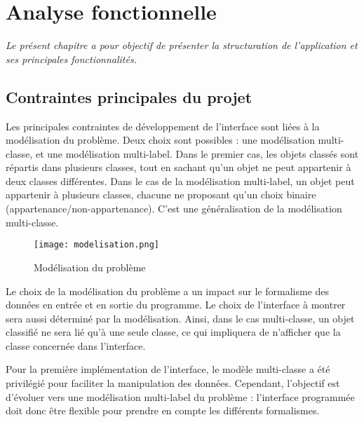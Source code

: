 \chapter[Analyse fonctionnelle]{Analyse fonctionnelle}

\textit{Le présent chapitre a pour objectif de présenter la structuration de l'application et ses principales fonctionnalités.}

\section{Contraintes principales du projet}

Les principales contraintes de développement de l’interface sont liées à la modélisation du problème. Deux choix sont possibles : une modélisation multi-classe, et une modélisation multi-label. Dans le premier cas, les objets classés sont répartis dans plusieurs classes, tout en sachant qu’un objet ne peut appartenir à deux classes différentes. Dans le cas de la modélisation multi-label, un objet peut appartenir à plusieurs classes, chacune ne proposant qu’un choix binaire (appartenance/non-appartenance). C’est une généralisation de la modélisation multi-classe.\newline

\begin{figure}[!h]
	\begin{center}
		\texttt{[image: modelisation.png]}  \\
		\caption[Modélisation du problème]{Modélisation du problème}
		\label{fig:modelisation}
	\end{center}
\end{figure}

Le choix de la modélisation du problème a un impact sur le formalisme des données en entrée et en sortie du programme. Le choix de l’interface à montrer sera aussi déterminé par la modélisation. Ainsi, dans le cas multi-classe, un objet classifié ne sera lié qu’à une seule classe, ce qui impliquera de n’afficher que la classe concernée dans l’interface.\newline

Pour la première implémentation de l’interface, le modèle multi-classe a été privilégié pour faciliter la manipulation des données. Cependant, l’objectif est d’évoluer vers une modélisation multi-label du problème : l’interface programmée doit donc être flexible pour prendre en compte les différents formalismes. \newline

